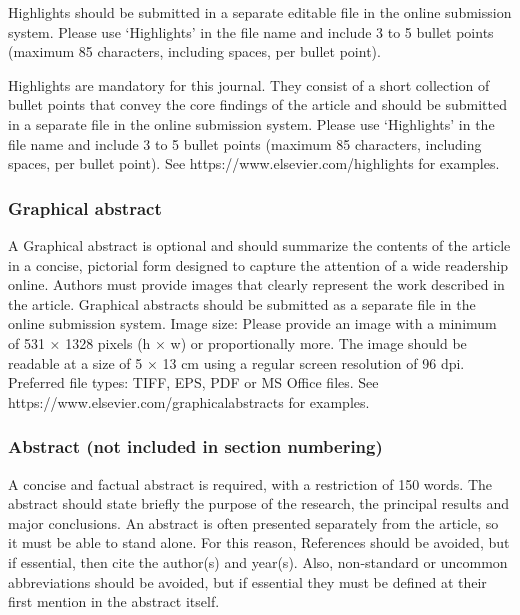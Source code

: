 \documentclass[
  number]{elsarticle}
\begin{document}
Highlights should be submitted in a separate editable file in the online
submission system. Please use `Highlights' in the file name and include
3 to 5 bullet points (maximum 85 characters, including spaces, per
bullet point).

Highlights are mandatory for this journal. They consist of a short
collection of bullet points that convey the core findings of the article
and should be submitted in a separate file in the online submission
system. Please use `Highlights' in the file name and include 3 to 5
bullet points (maximum 85 characters, including spaces, per bullet
point). See https://www.elsevier.com/highlights for examples.

\hypertarget{graphical-abstract-1}{%
\subsubsection{Graphical abstract}\label{graphical-abstract-1}}

A Graphical abstract is optional and should summarize the contents of
the article in a concise, pictorial form designed to capture the
attention of a wide readership online. Authors must provide images that
clearly represent the work described in the article. Graphical abstracts
should be submitted as a separate file in the online submission system.
Image size: Please provide an image with a minimum of 531 × 1328 pixels
(h × w) or proportionally more. The image should be readable at a size
of 5 × 13 cm using a regular screen resolution of 96 dpi. Preferred file
types: TIFF, EPS, PDF or MS Office files. See
https://www.elsevier.com/graphicalabstracts for examples.

\hypertarget{abstract-not-included-in-section-numbering}{%
\subsubsection{Abstract (not included in section
numbering)}\label{abstract-not-included-in-section-numbering}}

A concise and factual abstract is required, with a restriction of 150
words. The abstract should state briefly the purpose of the research,
the principal results and major conclusions. An abstract is often
presented separately from the article, so it must be able to stand
alone. For this reason, References should be avoided, but if essential,
then cite the author(s) and year(s). Also, non-standard or uncommon
abbreviations should be avoided, but if essential they must be defined
at their first mention in the abstract itself.
\end{document}
